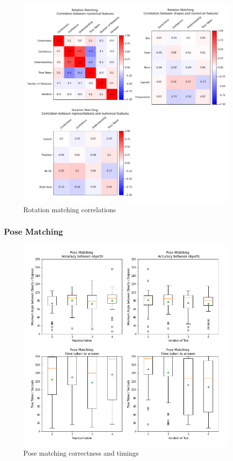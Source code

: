 \documentclass{l4proj}
\begin{document}
\begin{figure}
  \includegraphics[width=\textwidth]{images/results/rotation_matching_correlations.png}
  \caption{Rotation matching correlations}
  \label{fig:shape_corr}
\end{figure}

\subsubsection{Pose Matching}

\begin{figure}
  \includegraphics[width=\textwidth]{images/results/pose_matching_stats.png}
  \caption{Pose matching correctness and timings}
  \label{fig:shape_stats}
\end{figure}
\end{document}

